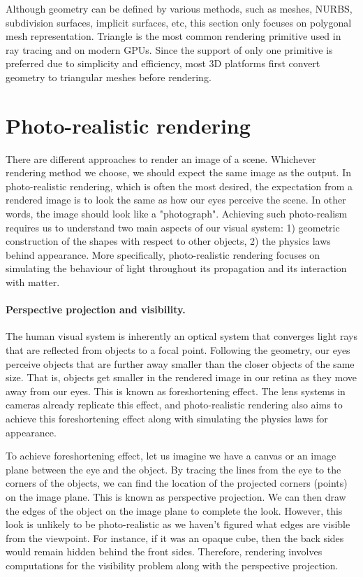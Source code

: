  Although geometry can be defined by various methods, such as meshes, NURBS, subdivision surfaces, implicit surfaces, etc, this section only focuses on polygonal mesh representation. Triangle is the most common rendering primitive used in ray tracing and on modern GPUs. Since the support of only one primitive is preferred due to simplicity and efficiency, most 3D platforms first convert geometry to triangular meshes before rendering.
 
\section{Photo-realistic rendering}
There are different approaches to render an image of a scene. Whichever rendering method we choose, we should expect the same image as the output. In photo-realistic rendering, which is often the most desired, the expectation from a rendered image is to look the same as how our eyes perceive the scene. In other words, the image should look like a "photograph". Achieving such photo-realism requires us to understand two main aspects of our visual system: 1) geometric construction of the shapes with respect to other objects, 2) the physics laws behind appearance. More specifically, photo-realistic rendering focuses on simulating the behaviour of light throughout its propagation and its interaction with matter.

\paragraph{Perspective projection and visibility.}

The human visual system is inherently an optical system that converges light rays that are reflected from objects to a focal point. Following the geometry, our eyes perceive objects that are further away smaller than the closer objects of the same size. That is, objects get smaller in the rendered image in our retina as they move away from our eyes. This is known as foreshortening effect. The lens systems in cameras already replicate this effect, and photo-realistic rendering also aims to achieve this foreshortening effect along with simulating the physics laws for appearance.  

To achieve foreshortening effect, let us imagine we have a canvas or an image plane between the eye and the object. By tracing the lines from the eye to the corners of the objects, we can find the location of the projected corners (points) on the image plane. This is known as perspective projection. We can then draw the edges of the object on the image plane to complete the look. However, this look is unlikely to be photo-realistic as we haven't figured what edges are visible from the viewpoint. For instance, if it was an opaque cube, then the back sides would remain hidden behind the front sides. Therefore, rendering involves computations for the visibility problem along with the perspective projection. 


